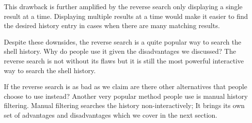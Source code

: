 \documentclass[thesis=M,english]{FITthesis}[2012/10/20]
\begin{document}
This drawback is further amplified by the reverse search only displaying a single result at a time. Displaying multiple results at a time would make it easier to find the desired history entry in cases when there are many matching results. 

Despite these downsides, the reverse search is a quite popular way to search the shell history. Why do people use it given the disadvantages we discussed? The reverse search is not without its flaws but it is still the most powerful interactive way to search the shell history. 

If the reverse search is as bad as we claim are there other alternatives that people choose to use instead? Another very popular method people use is manual history filtering. Manual filtering searches the history non-interactively; It brings its own set of advantages and disadvantages which we cover in the next section.





\end{document}
